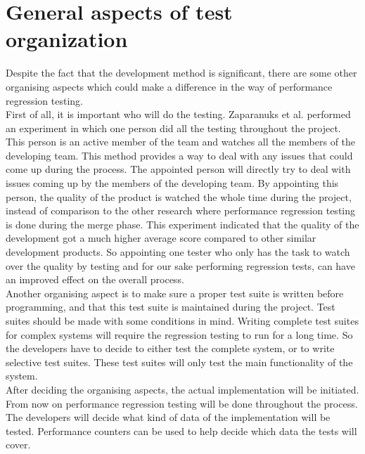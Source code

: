 \section{General aspects of test organization}
Despite the fact that the development method is significant, there are some other organising aspects which could make a difference in the way of performance regression testing. \\
First of all, it is important who will do the testing. Zaparanuks et al. performed an experiment in which one person did all the testing throughout the project. \cite{sutherland2009fully} This person is an active member of the team and watches all the members of the developing team. This method provides a way to deal with any issues that could come up during the process. The appointed person will directly try to deal with issues coming up by the members of the developing team. By appointing this person, the quality of the product is watched the whole time during the project, instead of comparison to the other research where performance regression testing is done during the merge phase. This experiment indicated that the quality of the development got a much higher average score compared to other similar development products. So appointing one tester who only has the task to watch over the quality by testing and for our sake performing regression tests, can have an improved effect on the overall process. \\

Another organising aspect is to make sure a proper test suite is written before programming, and that this test suite is maintained during the project. Test suites should be made with some conditions in mind. Writing complete test suites for complex systems will require the regression testing to run for a long time. \cite{rothermel2001prioritizing} So the developers have to decide to either test the complete system, or to write selective test suites. These test suites will only test the main functionality of the system. \\
After deciding the organising aspects, the actual implementation will be initiated. From now on performance regression testing will be done throughout the process. The developers will decide what kind of data of the implementation will be tested. Performance counters can be used to help decide which data the tests will cover.
